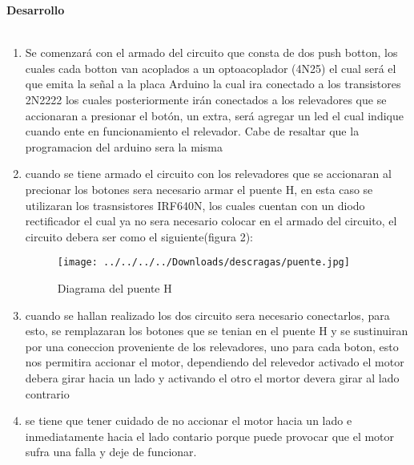 \documentclass[12pt]{report}
\begin{document}
{\huge \textbf{Desarrollo}\\}\\
\begin{enumerate}
\item Se comenzará con el armado del circuito que consta de dos push botton, los cuales cada botton van acoplados a un optoacoplador (4N25) el cual será el que emita la señal a la placa Arduino la cual ira conectado a los transistores 2N2222 los cuales posteriormente irán conectados a los relevadores que se accionaran a presionar el botón, un extra, será agregar un led el cual indique cuando ente en funcionamiento el relevador. Cabe de resaltar que la programacion del arduino sera la misma
\item cuando se tiene armado el circuito con los relevadores que se accionaran al precionar los botones sera necesario armar el puente H, en esta caso se utilizaran los trasnsistores IRF640N, los cuales cuentan con un diodo rectificador el cual ya no sera necesario colocar en el armado del circuito, el circuito debera ser como el siguiente(figura 2):
\begin{center}
\begin{figure}[hbtp]
\centering
\texttt{[image: ../../../../Downloads/descragas/puente.jpg]}
\caption{Diagrama del puente H}
\end{figure}
\end{center}
\item cuando se hallan realizado los dos circuito sera necesario conectarlos, para esto, se remplazaran los botones que se tenian en el puente H y se sustinuiran por una coneccion proveniente de los relevadores, uno para cada boton, esto nos permitira accionar el motor, dependiendo del relevedor activado el motor debera girar hacia un lado y activando el otro el mortor devera girar al lado contrario
\item se tiene que tener cuidado de no accionar el motor hacia un lado e inmediatamente hacia el lado contario porque puede provocar que el motor sufra una falla y deje de funcionar.
\end{enumerate}
\end{document}
